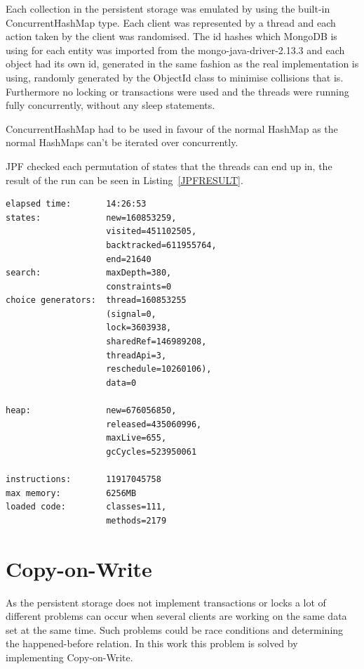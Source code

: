 \documentclass[a4paper,12pt]{article}
\begin{document}
Each collection in the persistent storage was emulated by using the built-in ConcurrentHashMap type. 
Each client was represented by a thread and each action taken by the client was randomised. The id hashes which MongoDB is 
using for each entity was imported from the mongo-java-driver-2.13.3 and each object had its own id, generated in the same 
fashion as the real implementation is using, randomly generated by the ObjectId class to minimise collisions that is. 
Furthermore no locking or transactions were used and the threads were running fully concurrently, without any sleep statements. 

ConcurrentHashMap had to be used in favour of the normal HashMap as the normal HashMaps can't be iterated over concurrently.

JPF checked each permutation of states that the threads can end up in, the result of the run can be seen in Listing~\ref{JPFRESULT}.

\newpage
\begin{lstlisting}[label=JPFRESULT,caption=Results of JPF run]
elapsed time:       14:26:53
states:             new=160853259,
                    visited=451102505,
                    backtracked=611955764,
                    end=21640
search:             maxDepth=380,
                    constraints=0
choice generators:  thread=160853255 
                    (signal=0,
                    lock=3603938,
                    sharedRef=146989208,
                    threadApi=3,
                    reschedule=10260106), 
                    data=0

heap:               new=676056850,
                    released=435060996,
                    maxLive=655,
                    gcCycles=523950061

instructions:       11917045758
max memory:         6256MB
loaded code:        classes=111,
                    methods=2179
\end{lstlisting}

\newpage 
\section{Copy-on-Write}
As the persistent storage does not implement transactions or locks a lot of different problems can occur when several 
clients are working on the same data set at the same time. Such problems could be race conditions and determining the 
happened-before relation. In this work this problem is solved by implementing Copy-on-Write.
\end{document}

